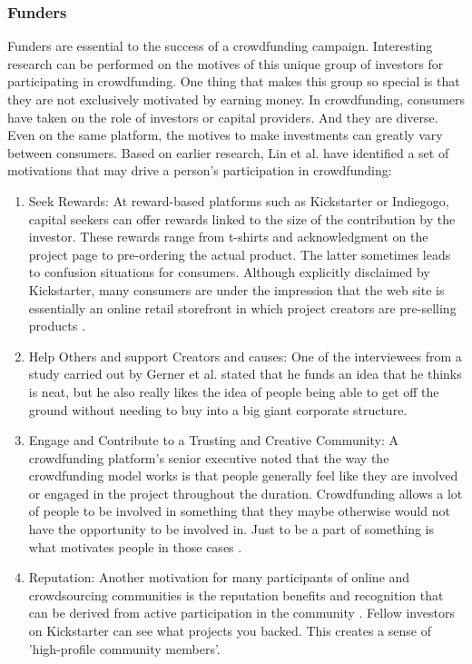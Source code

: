 \subsubsection*{Funders}
Funders are essential to the success of a crowdfunding campaign. Interesting research can be performed on the motives of this unique group of investors for participating in crowdfunding. One thing that
makes this group so special is that they are not exclusively motivated by earning money.
In crowdfunding, consumers have taken on the role of investors or capital providers. And they are diverse. Even on the same platform, the motives to make investments can greatly vary between consumers.
Based on earlier research, Lin et al. \cite{doi:10.5465/ambpp.2014.209} have identified a set of motivations that may drive a person’s participation in crowdfunding:

\begin{enumerate}
      \item Seek Rewards:
            At reward-based platforms such as Kickstarter or Indiegogo, capital seekers can offer rewards linked to the size of the contribution by the investor. These rewards range from t-shirts and
            acknowledgment on the project page to pre-ordering the actual product. The latter sometimes leads
            to confusion situations for consumers. Although explicitly disclaimed by Kickstarter, many consumers
            are under the impression that the web site is essentially an online retail storefront in which project
            creators are pre-selling products \cite{10.2139/ssrn.2234765}.

      \item Help Others and support Creators and causes: One of the interviewees from a study carried out by Gerner et al. \cite{inproceedings}
            stated that he funds an idea that he thinks is neat, but he also really likes the idea of people being
            able to get off the ground without needing to buy into a big giant corporate structure.

      \item Engage and Contribute to a Trusting and Creative Community:
            A crowdfunding platform’s senior executive noted that the way the crowdfunding model works is that people generally feel like they are involved or engaged in the project
            throughout the duration. Crowdfunding allows a lot of people to be involved in something that
            they maybe otherwise would not have the opportunity to be involved in. Just to be a part of something
            is what motivates people in those cases \cite{inproceedings}.

      \item Reputation:
            Another motivation for many participants of online and crowdsourcing communities is
            the reputation benefits and recognition that can be derived from active participation in the community \cite{doi:10.5465/ambpp.2014.209}.
            Fellow investors on Kickstarter can see what projects you backed. This creates a sense of ’high-profile
            community members’.
\end{enumerate}


